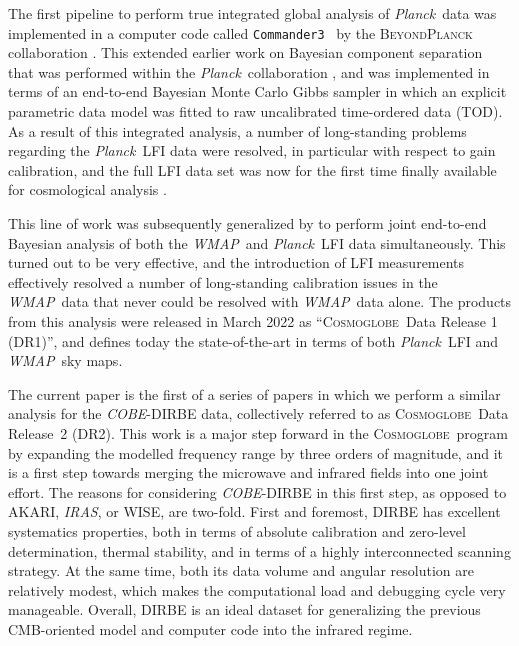 \documentclass{aa}
\def\Cosmoglobe{\textsc{Cosmoglobe}}
\def\commanderthree{\texttt{Commander3}}
\def\Planck{\textit{Planck}}
\def\WMAP{\textit{WMAP}}
\def\COBE{\textit{COBE}}
\def\AKARI{\textrm{{AKARI}}}
\def\IRAS{\textit{{IRAS}}}
\newcommand{\cosmoglobe}{\textsc{Cosmoglobe}}
\begin{document}
The first pipeline to perform true integrated global analysis of \Planck\ data was implemented in a computer code called \commanderthree\ \citep{bp03} by the \textsc{BeyondPlanck} collaboration \citep{bp01}. This extended earlier work on Bayesian component separation that was performed within the \Planck\ collaboration \citep{planck2014-a12}, and was implemented in terms of an end-to-end Bayesian Monte Carlo Gibbs sampler in which an explicit parametric data model was fitted to raw uncalibrated time-ordered data (TOD). As a result of this integrated analysis, a number of long-standing problems regarding the \Planck\ LFI data \citep{planck2016-l02} were resolved, in particular with respect to gain calibration, and the full LFI data set was now for the first time finally available for cosmological analysis \citep{bp10,bp11,bp12}.

This line of work was subsequently generalized by \citet{watts2023_dr1} to perform joint end-to-end Bayesian analysis of both the \WMAP\ and \Planck\ LFI data simultaneously. This turned out to be very effective, and the introduction of LFI measurements effectively resolved a number of long-standing calibration issues in the \WMAP\ data that never could be resolved with \WMAP\ data alone. The products from this analysis were released in March 2022 as ``\Cosmoglobe\ Data Release 1 (DR1)'', and defines today the state-of-the-art in terms of both \Planck\ LFI and \WMAP\ sky maps.

The current paper is the first of a series of papers in which we perform a similar analysis for the \COBE-DIRBE data, collectively referred to as \cosmoglobe\ Data Release~2 (DR2). This work is a major step forward in the \Cosmoglobe\ program by expanding the modelled frequency range by three orders of magnitude, and it is a first step towards merging the microwave and infrared fields into one joint effort. The reasons for considering \COBE-DIRBE in this first step, as opposed to \AKARI, \IRAS, or WISE, are two-fold. First and foremost, DIRBE has excellent systematics properties, both in terms of absolute calibration and zero-level determination, thermal stability, and in terms of a highly interconnected scanning strategy. At the same time, both its data volume and angular resolution are relatively modest, which  makes the computational load and debugging cycle very manageable. Overall, DIRBE is an ideal dataset for generalizing the previous CMB-oriented model and computer code into the infrared regime.
\end{document}
